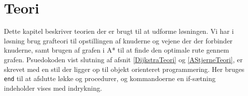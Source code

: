 \chapter{Teori}\label{Teori}
Dette kapitel beskriver teorien der er brugt til at udforme løsningen. Vi har i løsning brug grafteori til opstillingen af knuderne og vejene der der forbinder knuderne, samt brugen af grafen i A* til at finde den optimale rute gennem grafen. Psuedokoden vist slutning af afsnit \ref{DijkstraTeori} og \ref{AStjerneTeori}, er skrevet med en stil der ligger op til objekt orienteret programmering. Her bruges \texttt{end} til at afslutte løkke og procedurer, og kommandoerne en if-sætning indeholder vises med indrykning.
\newpage

\newpage

















